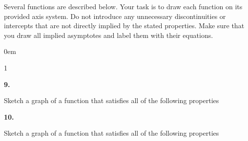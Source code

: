 \documentclass[12pt,]{book}
\theoremstyle{plain}
\theoremstyle{definition}
\numberwithin{equation}{section}
\newcounter{figstack}
\newcounter{figindex}
\newlength\fight
\newcommand\pushValignCaptionBottom[5][b]{%
\stepcounter{figstack}%
\expandafter\def\csname %
figalign\romannumeral\value{figstack}\endcsname{#1}%
\expandafter\def\csname %
figtype\romannumeral\value{figstack}\endcsname{#2}%
\expandafter\def\csname %
figwd\romannumeral\value{figstack}\endcsname{#3}%
\expandafter\def\csname %
figcontent\romannumeral\value{figstack}\endcsname{#4}%
\expandafter\def\csname %
figcap\romannumeral\value{figstack}\endcsname{#5}%
\setbox0=\hbox{%
\begin{#2}{#3}#4\end{#2}}%
\ifdim\dimexpr\ht0+\dp0\relax>\fight\global\setlength{\fight}{%
\dimexpr\ht0+\dp0\relax}\fi%
}
\newcommand\popValignCaptionBottom{%
\setcounter{figindex}{0}%
\hfill%
\whiledo{\value{figindex}<\value{figstack}}{%
\stepcounter{figindex}%
\def\tmp{\csname figwd\romannumeral\value{figindex}\endcsname}%
\begin{\csname figtype\romannumeral\value{figindex}\endcsname}[t]{\tmp}%
\centering%
\stackinset{c}{}%
{\csname figalign\romannumeral\value{figindex}\endcsname}{}%
{\csname figcontent\romannumeral\value{figindex}\endcsname}%
{\rule{0pt}{\fight}}\par%
\csname figcap\romannumeral\value{figindex}\endcsname%
\end{\csname figtype\romannumeral\value{figindex}\endcsname}%
\hfill%
}%
\setcounter{figstack}{0}%
\setlength{\fight}{0pt}%
\hfill%
}
\newenvironment{exercisegroup}%
{\medskip\noindent}%
{\par\bigskip}%
\newlength{\exercisegroupindent}%
\newlength{\exercisegroupitemwidth}%
\newenvironment{exercisegrouplist}%
{\vspace{-\partopsep}%
\begin{adjustwidth}{\exercisegroupindent}{0em}}%
{\end{adjustwidth}%
\vspace{-\partopsep}%
\vspace{\baselineskip}}%
\newenvironment{exercisegroupbycol}[1]%
{\begin{exercisegrouplist}%
\vspace{-\multicolsep}%
\begin{multicols}{#1}%
\setlength{\parindent}{0em}%
\setlength{\exercisegroupitemwidth}{\linewidth}}%
{\end{multicols}%
\vspace{-\multicolsep}%
\end{exercisegrouplist}}%
\newenvironment{exercisegroupitem}[1]%
{\begin{minipage}[t]{\exercisegroupitemwidth}
\vspace{0pt}%
{\bfseries#1}%
\rule{0pt}{\baselineskip}}{\strut%
\end{minipage}%
\hspace{\columnsep}}%
\providecommand\phantomsection{}
\newcommand{\fe}[2]{\mathop{{#1}{\left(#2\right)}}}
\begin{document}
\begin{exercisegroup}%
Several functions are described below. Your task is to draw each function on its provided axis system. Do not introduce any unnecessary discontinuities or intercepts that are not directly implied by the stated properties. Make sure that you draw all implied asymptotes and label them with their equations.%
\begin{exercisegroupbycol}{1}%
\begin{exercisegroupitem}{9. }\phantomsection\hypertarget{exercise-104}{\null}
Sketch a graph of a function that satisfies all of the following properties%
\end{exercisegroupitem}%
\par%
\begin{exercisegroupitem}{10. }\phantomsection\hypertarget{exercise-105}{\null}
Sketch a graph of a function that satisfies all of the following properties%
\end{exercisegroupitem}
\end{exercisegroupbycol}
\end{exercisegroup}
\end{document}

